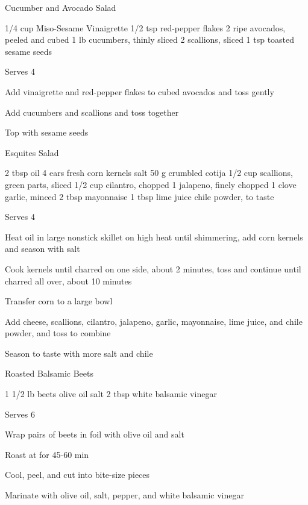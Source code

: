 \begin{denserecipe}{Cucumber and Avocado Salad}{}
\begin{ingredients}
1/4 cup Miso-Sesame Vinaigrette
1/2 tsp red-pepper flakes
2 ripe avocados, peeled and cubed
1 lb cucumbers, thinly sliced
2 scallions, sliced
1 tsp toasted sesame seeds
\end{ingredients}
\nextcolumn
Serves 4
\begin{steps}
\item Add vinaigrette and red-pepper flakes to cubed avocados and toss gently
\item Add cucumbers and scallions and toss together
\item Top with sesame seeds
\end{steps}
\end{denserecipe}

\begin{denserecipe}{Esquites Salad}{}
\begin{ingredients}
2 tbsp oil
4 ears fresh corn kernels
salt
50 g crumbled cotija
1/2 cup scallions, green parts, sliced
1/2 cup cilantro, chopped
1 jalapeno, finely chopped
1 clove garlic, minced
2 tbsp mayonnaise
1 tbsp lime juice
chile powder, to taste
\end{ingredients}
\nextcolumn
Serves 4
\begin{steps}
    \item Heat oil in large nonstick skillet on high heat until shimmering, add corn kernels and season with salt
    \item Cook kernels until charred on one side, about 2 minutes, toss and continue until charred all over, about 10 minutes
    \item Transfer corn to a large bowl
    \item Add cheese, scallions, cilantro, jalapeno, garlic, mayonnaise, lime juice, and chile powder, and toss to combine
    \item Season to taste with more salt and chile
\end{steps}
\end{denserecipe}

\begin{recipe}{Roasted Balsamic Beets}{}
\begin{ingredients}
1 1/2 lb beets
olive oil
salt
2 tbsp white balsamic vinegar
\end{ingredients}
\nextcolumn
Serves 6
\begin{steps}
\item Wrap pairs of beets in foil with olive oil and salt
\item Roast at  for 45-60 min
\item Cool, peel, and cut into bite-size pieces
\item Marinate with olive oil, salt, pepper, and white balsamic vinegar
\end{steps}
\end{recipe}

